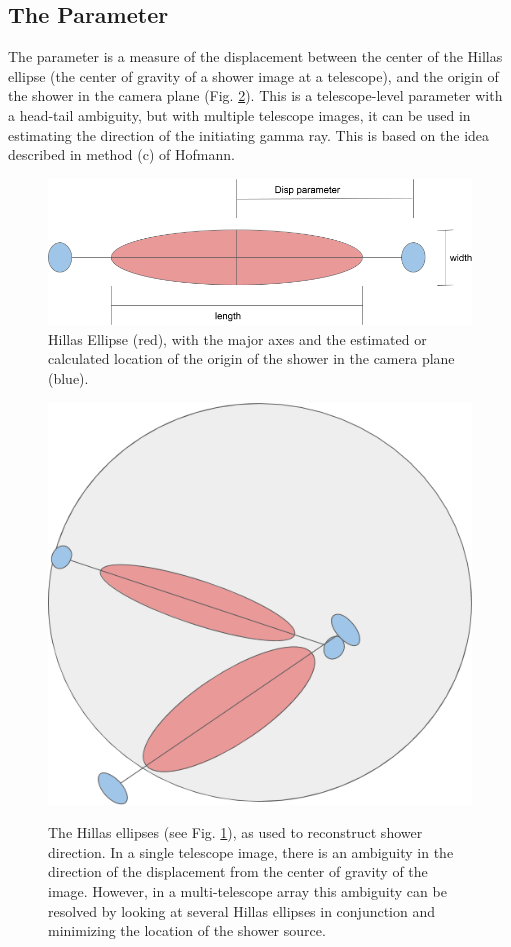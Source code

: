 \documentclass[main.tex]{subfiles}
\begin{document}

\subsection{The \disp Parameter}
The \disp parameter is a measure of the displacement between the center of the Hillas ellipse (the center of gravity of a shower image at a telescope), and the origin of the shower in the camera plane (Fig. \ref{fig:Disp_FOV}). This is a telescope-level parameter with a head-tail ambiguity, but with multiple telescope images, it can be used in estimating the direction of the initiating gamma ray. This is based on the idea described in method (c) of Hofmann\cite{Hofmann:1999dx}.
\begin{figure}[htbp]
  \centering
  \includegraphics[width=.58\linewidth]{images/Disp_param}
  \caption[The Hillas ellipse.]{Hillas Ellipse (red), with the major axes and the estimated or calculated location of the origin of the shower in the camera plane (blue).}
  \label{fig:hillas_ellipse}
\end{figure}

\begin{figure}[H]
  \begin{center}
      \includegraphics[width=0.48\linewidth]{images/Disp_FOV}
      \label{fig:Disp_FOV}
  \end{center}
  \caption[The Disp Parameter.]{The Hillas ellipses (see Fig. \ref{fig:hillas_ellipse}), as used to reconstruct shower direction. In a single telescope image, there is an ambiguity in the direction of the displacement from the center of gravity of the image. However, in a multi-telescope array this ambiguity can be resolved by looking at several Hillas ellipses in conjunction and minimizing the location of the shower source.}
  \label{fig:Disp_FOV}
\end{figure}

\end{document}

